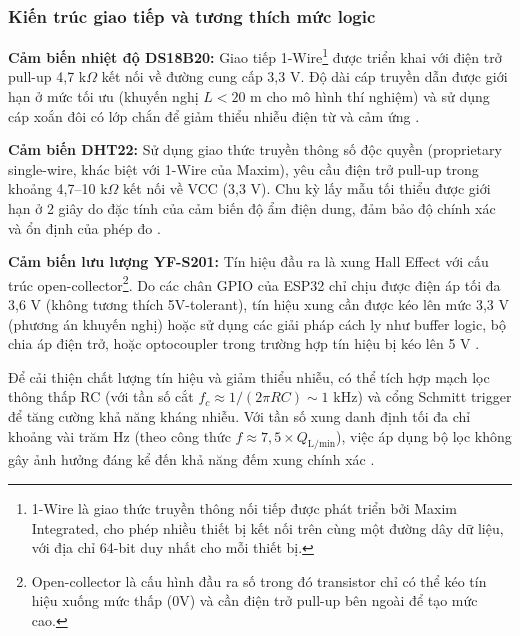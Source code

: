 \documentclass[../main.tex]{subfiles}
\begin{document}
\subsubsection{Kiến trúc giao tiếp và tương thích mức logic}
\textbf{Cảm biến nhiệt độ DS18B20:} Giao tiếp 1-Wire\footnote{1-Wire là giao thức truyền thông nối tiếp được phát triển bởi Maxim Integrated, cho phép nhiều thiết bị kết nối trên cùng một đường dây dữ liệu, với địa chỉ 64-bit duy nhất cho mỗi thiết bị.} được triển khai với điện trở pull-up 4,7 k$\Omega$ kết nối về đường cung cấp 3,3 V. Độ dài cáp truyền dẫn được giới hạn ở mức tối ưu (khuyến nghị $L < 20$ m cho mô hình thí nghiệm) và sử dụng cáp xoắn đôi có lớp chắn để giảm thiểu nhiễu điện từ và cảm ứng \cite{datasheet_DS18B20}.

\textbf{Cảm biến DHT22:} Sử dụng giao thức truyền thông số độc quyền (proprietary single-wire, khác biệt với 1-Wire của Maxim), yêu cầu điện trở pull-up trong khoảng 4,7--10 k$\Omega$ kết nối về VCC (3,3 V). Chu kỳ lấy mẫu tối thiểu được giới hạn ở 2 giây do đặc tính của cảm biến độ ẩm điện dung, đảm bảo độ chính xác và ổn định của phép đo \cite{datasheet_DHT22}.

\textbf{Cảm biến lưu lượng YF-S201:} Tín hiệu đầu ra là xung Hall Effect với cấu trúc open-collector\footnote{Open-collector là cấu hình đầu ra số trong đó transistor chỉ có thể kéo tín hiệu xuống mức thấp (0V) và cần điện trở pull-up bên ngoài để tạo mức cao.}. Do các chân GPIO của ESP32 chỉ chịu được điện áp tối đa 3,6 V (không tương thích 5V-tolerant), tín hiệu xung cần được kéo lên mức 3,3 V (phương án khuyến nghị) hoặc sử dụng các giải pháp cách ly như buffer logic, bộ chia áp điện trở, hoặc optocoupler trong trường hợp tín hiệu bị kéo lên 5 V \cite{datasheet_YFS201,Espressif_ESP32_technical_reference}. 

Để cải thiện chất lượng tín hiệu và giảm thiểu nhiễu, có thể tích hợp mạch lọc thông thấp RC (với tần số cắt $f_c \approx 1/(2\pi RC) \sim 1$ kHz) và cổng Schmitt trigger để tăng cường khả năng kháng nhiễu. Với tần số xung danh định tối đa chỉ khoảng vài trăm Hz (theo công thức $f \approx 7,5 \times Q_{\text{L/min}}$), việc áp dụng bộ lọc không gây ảnh hưởng đáng kể đến khả năng đếm xung chính xác \cite{datasheet_YFS201}.
\end{document}
